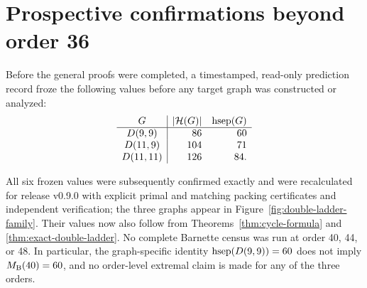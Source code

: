 \section{Prospective confirmations beyond order 36}
\label{sec:prospective}

Before the general proofs were completed, a timestamped, read-only prediction
record froze the following values before any target graph was constructed or
analyzed:
\[
\begin{array}{c|rr}
G & |\mathcal{H}(G)| & \operatorname{hsep}(G)\\ \hline
D(9,9) & 86 & 60\\
D(11,9) & 104 & 71\\
D(11,11) & 126 & 84.
\end{array}
\]

All six frozen values were subsequently confirmed exactly and were recalculated
for release v0.9.0 with explicit primal and matching packing certificates and
independent verification; the three graphs appear in
Figure~\ref{fig:double-ladder-family}.  Their values now also follow from
Theorems~\ref{thm:cycle-formula} and
\ref{thm:exact-double-ladder}.  No complete Barnette census was run at order
40, 44, or 48.  In particular, the graph-specific identity
\(\operatorname{hsep}(D(9,9))=60\) does not imply \(M_{\mathrm B}(40)=60\), and no order-level
extremal claim is made for any of the three orders.
